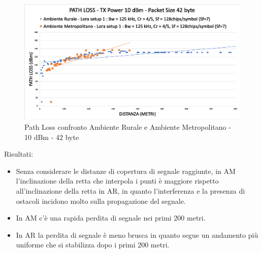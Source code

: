 \documentclass[12pt,a4paper,openright,twoside]{report}
\begin{document}
\begin{figure}[h]                      
\begin{center} 
\includegraphics[width=\textwidth]{path_loss.png}
\caption[Path Loss confronto Ambiente Rurale e Ambiente Metropolitano - 10 dBm - 42 byte]{Path Loss confronto Ambiente Rurale e Ambiente Metropolitano - 10 dBm - 42 byte}\label{fig:prima}
\end{center}
\end{figure}

Risultati:
\begin{itemize}    
\item Senza considerare le distanze di copertura di segnale raggiunte, in AM l'inclinazione della retta che interpola i punti \`e maggiore rispetto all'inclinazione della retta in AR, in quanto l'interferenza e la presenza di ostacoli incidono molto sulla propagazione del segnale. 
\item In AM c'\`e una rapida perdita di segnale nei primi 200 metri.
\item In AR la perdita di segnale \`e meno brusca in quanto segue un andamento pi\`u uniforme che si stabilizza dopo i primi 200 metri.
\end{itemize}
\end{document}
